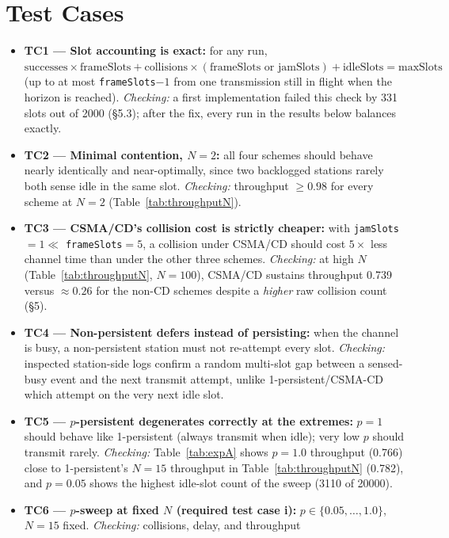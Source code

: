\documentclass[11pt]{article}
\begin{document}
\section{Test Cases}
\begin{itemize}[leftmargin=1.6em]
  \item \textbf{TC1 --- Slot accounting is exact:} for any run,
  $\text{successes}\times\text{frameSlots} + \text{collisions}\times(\text{frameSlots or
  jamSlots}) + \text{idleSlots} = \text{maxSlots}$ (up to at most \texttt{frameSlots}$-1$
  from one transmission still in flight when the horizon is reached). \emph{Checking:} a
  first implementation failed this check by 331 slots out of 2000 (\S5.3); after the fix,
  every run in the results below balances exactly.
  \item \textbf{TC2 --- Minimal contention, $N{=}2$:} all four schemes should behave nearly
  identically and near-optimally, since two backlogged stations rarely both sense idle in
  the same slot. \emph{Checking:} throughput $\ge 0.98$ for every scheme at $N{=}2$
  (Table~\ref{tab:throughputN}).
  \item \textbf{TC3 --- CSMA/CD's collision cost is strictly cheaper:} with
  \texttt{jamSlots}$=1 \ll$ \texttt{frameSlots}$=5$, a collision under CSMA/CD should cost
  $5\times$ less channel time than under the other three schemes. \emph{Checking:} at high
  $N$ (Table~\ref{tab:throughputN}, $N{=}100$), CSMA/CD sustains throughput 0.739 versus
  $\approx 0.26$ for the non-CD schemes despite a \emph{higher} raw collision count (\S5).
  \item \textbf{TC4 --- Non-persistent defers instead of persisting:} when the channel is
  busy, a non-persistent station must not re-attempt every slot. \emph{Checking:} inspected
  station-side logs confirm a random multi-slot gap between a sensed-busy event and the next
  transmit attempt, unlike 1-persistent/CSMA-CD which attempt on the very next idle slot.
  \item \textbf{TC5 --- $p$-persistent degenerates correctly at the extremes:} $p{=}1$
  should behave like 1-persistent (always transmit when idle); very low $p$ should transmit
  rarely. \emph{Checking:} Table~\ref{tab:expA} shows $p{=}1.0$ throughput (0.766) close to
  1-persistent's $N{=}15$ throughput in Table~\ref{tab:throughputN} (0.782), and $p{=}0.05$
  shows the highest idle-slot count of the sweep (3110 of 20000).
  \item \textbf{TC6 --- $p$-sweep at fixed $N$ (required test case i):} $p \in
  \{0.05,\dots,1.0\}$, $N{=}15$ fixed. \emph{Checking:} collisions, delay, and throughput

\end{itemize}
\end{document}
